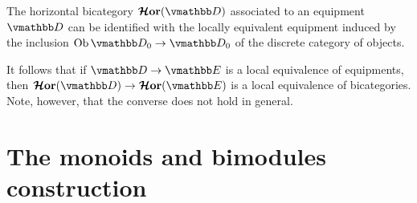 \documentclass[11pt,oneside,article]{memoir}
\begin{document}
\begin{example}\label{ex:horizontal_bicategory}
   The horizontal bicategory $\HHor(\dcat{D})$ associated to an equipment $\dcat{D}$ can be
   identified with the locally equivalent equipment induced by the inclusion
   $\Ob\dcat{D}_0\to\dcat{D}_0$ of the discrete category of objects. 

   It follows that if $\dcat{D}\to\dcat{E}$ is a local equivalence of equipments, then
   $\HHor(\dcat{D})\to\HHor(\dcat{E})$ is a local equivalence of bicategories. Note, however, that
   the converse does not hold in general.
\end{example}




\section{The monoids and bimodules construction}
\end{document}
